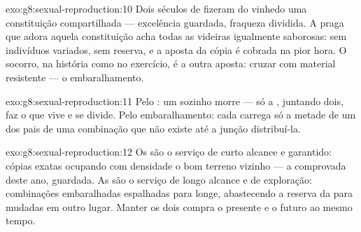 \begin{solution}{exo:g8:sexual-reproduction:10}
Dois séculos de  fizeram do vinhedo uma constituição
compartilhada --- excelência guardada, fraqueza dividida. A praga que
adora aquela constituição acha todas as videiras igualmente
saborosas: sem indivíduos variados, sem reserva, e a aposta da cópia é
cobrada na pior hora. O socorro, na história como no exercício, é a
outra aposta: cruzar com material resistente --- o embaralhamento.
\end{solution}

\begin{solution}{exo:g8:sexual-reproduction:11}
Pelo : um  sozinho morre --- só a , juntando
dois, faz o  que vive e se divide. Pelo embaralhamento: cada
 carrega só a metade de um dos pais de uma combinação que não
existe até a junção distribuí-la.
\end{solution}

\begin{solution}{exo:g8:sexual-reproduction:12}
Os  são o serviço de curto alcance e garantido: cópias exatas
ocupando com densidade o bom terreno vizinho --- a  comprovada
deste ano, guardada. As  são o serviço de longo alcance e de
exploração: combinações embaralhadas espalhadas para longe,
abastecendo a reserva da  para  mudadas em outro
lugar. Manter os dois compra o presente e o futuro ao mesmo tempo.
\end{solution}

